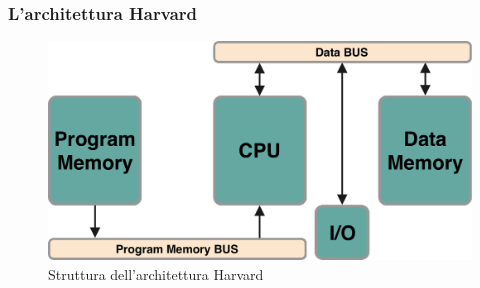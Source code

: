 \begin{frame}
	\frametitle{L'architettura Harvard}
	
	\begin{figure}[!htbp]
		\centering 
		\includegraphics[width=0.9\linewidth]{images/3_architetture/architecture_harvard.pdf}
			\caption{Struttura dell'architettura Harvard} 
	\end{figure}
	
\end{frame}
